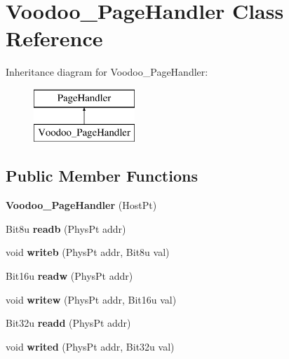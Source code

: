 \hypertarget{classVoodoo__PageHandler}{\section{Voodoo\-\_\-\-Page\-Handler Class Reference}
\label{classVoodoo__PageHandler}
}
Inheritance diagram for Voodoo\-\_\-\-Page\-Handler\-:\begin{figure}[H]
\begin{center}
\leavevmode
\includegraphics[height=2.000000cm]{classVoodoo__PageHandler}
\end{center}
\end{figure}
\subsection*{Public Member Functions}
\begin{DoxyCompactItemize}
\item 
\hypertarget{classVoodoo__PageHandler_a716fc1c10feb37ca8b1a5ae1646a195e}{{\bfseries Voodoo\-\_\-\-Page\-Handler} (Host\-Pt)}\label{classVoodoo__PageHandler_a716fc1c10feb37ca8b1a5ae1646a195e}

\item 
\hypertarget{classVoodoo__PageHandler_ab219539f2e9492ec338925c881292edf}{Bit8u {\bfseries readb} (Phys\-Pt addr)}\label{classVoodoo__PageHandler_ab219539f2e9492ec338925c881292edf}

\item 
\hypertarget{classVoodoo__PageHandler_a89b6bd3b06030472eef2df95bf8ee2e6}{void {\bfseries writeb} (Phys\-Pt addr, Bit8u val)}\label{classVoodoo__PageHandler_a89b6bd3b06030472eef2df95bf8ee2e6}

\item 
\hypertarget{classVoodoo__PageHandler_a495dffdd52b25693468da7f2d287f350}{Bit16u {\bfseries readw} (Phys\-Pt addr)}\label{classVoodoo__PageHandler_a495dffdd52b25693468da7f2d287f350}

\item 
\hypertarget{classVoodoo__PageHandler_a2546a33d0943bd73d45b33e83941434a}{void {\bfseries writew} (Phys\-Pt addr, Bit16u val)}\label{classVoodoo__PageHandler_a2546a33d0943bd73d45b33e83941434a}

\item 
\hypertarget{classVoodoo__PageHandler_a3dfdf92e33bedca224384d22fdc31a51}{Bit32u {\bfseries readd} (Phys\-Pt addr)}\label{classVoodoo__PageHandler_a3dfdf92e33bedca224384d22fdc31a51}

\item 
\hypertarget{classVoodoo__PageHandler_a7923c6a2ab2028eb59f34912b2f05551}{void {\bfseries writed} (Phys\-Pt addr, Bit32u val)}\label{classVoodoo__PageHandler_a7923c6a2ab2028eb59f34912b2f05551}

\end{DoxyCompactItemize}


